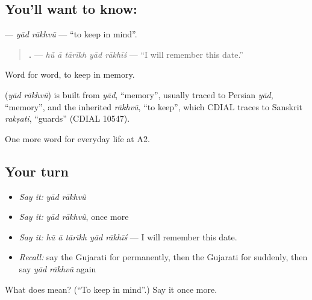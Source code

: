 \subsection*{You'll want to know:  }
\textbf{ } — \emph{yād rākhvũ} — \textquotedblleft{}to keep in mind\textquotedblright{}.

\begin{quote}
\textbf{    .} — \emph{hũ ā tārīkh yād rākhīś} — \textquotedblleft{}I will remember this date.\textquotedblright{}
\end{quote}

Word for word, to keep in memory.

\begin{cousinweb}
\textbf{ } (\emph{yād rākhvũ}) is built from \emph{yād}, \textquotedblleft{}memory\textquotedblright{}, usually traced to Persian \emph{yād}, \textquotedblleft{}memory\textquotedblright{}, and the inherited \emph{rākhvũ}, \textquotedblleft{}to keep\textquotedblright{}, which CDIAL traces to Sanskrit \emph{rakṣati}, \textquotedblleft{}guards\textquotedblright{} (CDIAL 10547).
\end{cousinweb}

\begin{grammarlens}[title={What you've built}]
One more word for everyday life at A2.
\end{grammarlens}

\subsection*{Your turn}
\begin{itemize}
\raggedright
  \item \emph{Say it:} \emph{yād rākhvũ}
  \item \emph{Say it:} \emph{yād rākhvũ}, once more
  \item \emph{Say it:} \emph{hũ ā tārīkh yād rākhīś} — I will remember this date.
  \item \emph{Recall:} say the Gujarati for permanently, then the Gujarati for suddenly, then say \emph{yād rākhvũ} again
\end{itemize}

\begin{tcolorbox}[breakable,colback=teal!4,colframe=teal!35!black,title={Before you move on}]
What does   mean? (\textquotedblleft{}To keep in mind\textquotedblright{}.) Say it once more.
\end{tcolorbox}
